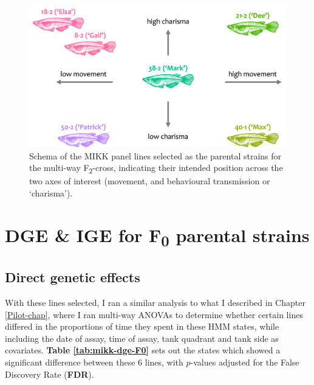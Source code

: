 \documentclass[
]{book}
\begin{document}
\begin{figure}
\includegraphics[width=1\linewidth]{figs/mikk_behaviour/line_selection_schema} \caption{Schema of the MIKK panel lines selected as the parental strains for the multi-way F\textsubscript{2}-cross, indicating their intended position across the two axes of interest (movement, and behavioural transmission or `charisma').}\label{fig:F0-line-select-schema}
\end{figure}

\clearpage

\hypertarget{dge-ige-for-f0-parental-strains}{%
\section{\texorpdfstring{DGE \& IGE for F\textsubscript{0} parental strains}{DGE \& IGE for F0 parental strains}}\label{dge-ige-for-f0-parental-strains}}

\hypertarget{direct-genetic-effects-1}{%
\subsection{Direct genetic effects}\label{direct-genetic-effects-1}}

With these lines selected, I ran a similar analysis to what I described in Chapter \ref{Pilot-chap}, where I ran multi-way ANOVAs to determine whether certain lines differed in the proportions of time they spent in these HMM states, while including the date of assay, time of assay, tank quadrant and tank side as covariates. \textbf{Table \ref{tab:mikk-dge-F0}} sets out the states which showed a significant difference between these 6 lines, with \(p\)-values adjusted for the False Discovery Rate (\textbf{FDR}).
\end{document}
